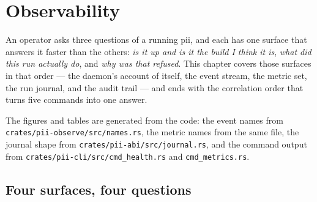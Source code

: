 \chapter{Observability}

\label{ch:observability}

An operator asks three questions of a running pii, and each has one surface that answers it
faster than the others: \emph{is it up and is it the build I think it is}, \emph{what did this
run actually do}, and \emph{why was that refused}. This chapter covers those surfaces in that
order --- the daemon's account of itself, the event stream, the metric set, the run journal,
and the audit trail --- and ends with the correlation order that turns five commands into one
answer.

The figures and tables are generated from the code: the event names from
\texttt{crates/pii-observe/src/names.rs}, the metric names from the same file, the journal
shape from \texttt{crates/pii-abi/src/journal.rs}, and the command output from
\texttt{crates/pii-cli/src/cmd\_health.rs} and \texttt{cmd\_metrics.rs}.

\section{Four surfaces, four questions}

\begin{center}
\begin{minipage}{\linewidth}
\centering
{}
\end{minipage}
\end{center}

